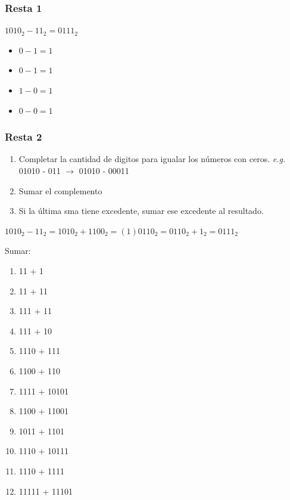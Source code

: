\begin{frame}
    \frametitle{Resta 1}
    $1010_{2} - 11_{2} = 0111_{2}$
    \begin{itemize}
        \item $0 - 1 = 1$ 
        \item $0 - 1 = 1$ \pause
        \item $1 - 0 = 1$ \pause
        \item $0 - 0 = 1$ \pause
    \end{itemize}
\end{frame}



\begin{frame}
    \frametitle{Resta 2}
    \begin{enumerate}
        \item Completar la cantidad de digitos para igualar los n\'umeros con ceros. \emph{e.g.} 01010 - 011 $\rightarrow$ 01010 - 00011
        \item Sumar el complemento
        \item Si la \'ultima sma tiene excedente, sumar ese excedente al resultado.
   \end{enumerate}
   \pause
    $1010_{2} - 11_{2} = 1010_{2} + 1100_{2} = (1)0110_{2} = 0110_{2} + 1_{2} = 0111_{2}$
\end{frame}

\begin{frame}
    \begin{ejercicio}{}
    Sumar:
        \begin{enumerate}
            \item 11 + 1	
            \item 11 + 11	
            \item 111 + 11	
            \item 111 + 10	
            \item 1110 + 111	
            \item 1100 + 110	
            \item 1111 + 10101	
            \item 1100 + 11001	
            \item 1011 + 1101	
            \item 1110 + 10111	
            \item 1110 + 1111	
            \item 11111 + 11101	
        \end{enumerate}
    \end{ejercicio}
\end{frame}

